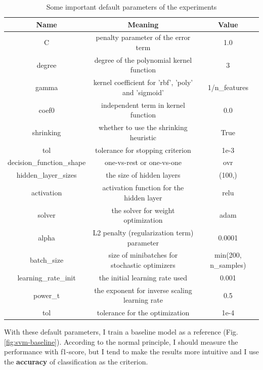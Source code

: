 \documentclass[12pt,a4paper]{article}
\theoremstyle{definition}
\begin{document}
\begin{table}[H]
	\renewcommand\arraystretch{1.35}
	\caption{Some important default parameters of the experiments}
	\label{tab:default-para}
	\centering
	
	\begin{tabular}{c|c|c}
		\centering
		Name & Meaning & Value \\
		\hline
		\hline
		
		C & penalty parameter of the error term & 1.0 \\
		degree & degree of the polynomial kernel function & 3 \\
		gamma & kernel coefficient for 'rbf', 'poly' and 'sigmoid' & 1/n\_features \\
		coef0 & independent term in kernel function & 0.0 \\
		shrinking & whether to use the shrinking heuristic & True \\
		tol & tolerance for stopping criterion & 1e-3 \\
		decision\_function\_shape & one-vs-rest or one-vs-one & ovr \\
		
		\hline
		
		hidden\_layer\_sizes & the size of hidden layers & (100,) \\
		activation & activation function for the hidden layer & relu \\
		solver & the solver for weight optimization & adam \\
		alpha & L2 penalty (regularization term) parameter & 0.0001 \\
		batch\_size & size of minibatches for stochastic optimizers & min(200, n\_samples) \\
		learning\_rate\_init & the initial learning rate used & 0.001 \\
		power\_t & the exponent for inverse scaling learning rate & 0.5 \\
		tol & tolerance for the optimization & 1e-4 \\
		
	\end{tabular}
\end{table}

With these default parameters, I train a baseline model as a reference (Fig. \ref{fig:svm-baseline}). According to the normal principle, I should measure the performance with f1-score, but I tend to make the results more intuitive and I use the \textbf{accuracy} of classification as the criterion.
\end{document}
